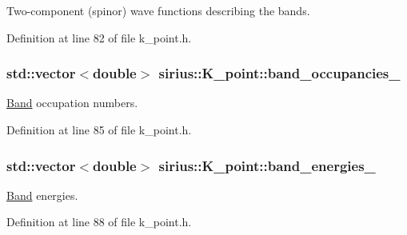 Two-\/component (spinor) wave functions describing the bands. 



Definition at line 82 of file k\+\_\+point.\+h.

\hypertarget{classsirius_1_1_k__point_afe99a469c933f236459d322eef90af16}{}
\subsubsection[{band\+\_\+occupancies\+\_\+}]{\setlength{\rightskip}{0pt plus 5cm}std\+::vector$<$double$>$ sirius\+::\+K\+\_\+point\+::band\+\_\+occupancies\+\_\+\hspace{0.3cm}{\ttfamily [private]}}\label{classsirius_1_1_k__point_afe99a469c933f236459d322eef90af16}


\hyperlink{classsirius_1_1_band}{Band} occupation numbers. 



Definition at line 85 of file k\+\_\+point.\+h.

\hypertarget{classsirius_1_1_k__point_ad1212379cf77eb9c948336b60c06622f}{}
\subsubsection[{band\+\_\+energies\+\_\+}]{\setlength{\rightskip}{0pt plus 5cm}std\+::vector$<$double$>$ sirius\+::\+K\+\_\+point\+::band\+\_\+energies\+\_\+\hspace{0.3cm}{\ttfamily [private]}}\label{classsirius_1_1_k__point_ad1212379cf77eb9c948336b60c06622f}


\hyperlink{classsirius_1_1_band}{Band} energies. 



Definition at line 88 of file k\+\_\+point.\+h.

\hypertarget{classsirius_1_1_k__point_a5d6c36943d1096bf7e27e0a81ac834e3}{}
